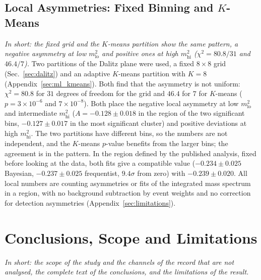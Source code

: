 \subsection{Local Asymmetries: Fixed Binning and $K$-Means}
\label{sec:comparison_local}
\emph{In short: the fixed grid and the $K$-means partition show the same pattern, a negative asymmetry at low $m^2_{\mathrm{lo}}$ and positive ones at high $m^2_{\mathrm{hi}}$ ($\chi^2=80.8/31$ and $46.4/7$).}
Two partitions of the Dalitz plane were used, a fixed $8\times8$ grid (Sec.~\ref{sec:dalitz}) and an adaptive $K$-means partition with $K=8$ (Appendix~\ref{sec:ml_kmeans}). Both find that the asymmetry is not uniform: $\chi^2=80.8$ for $31$ degrees of freedom for the grid and $46.4$ for $7$ for $K$-means ($p=3\times10^{-6}$ and $7\times10^{-8}$). Both place the negative local asymmetry at low $m^2_{\mathrm{lo}}$ and intermediate $m^2_{\mathrm{hi}}$ ($A=-0.128\pm0.018$ in the region of the two significant bins, $-0.127\pm0.017$ in the most significant cluster) and positive deviations at high $m^2_{\mathrm{hi}}$. The two partitions have different bins, so the numbers are not independent, and the $K$-means $p$-value benefits from the larger bins; the agreement is in the pattern. In the region defined by the published analysis, fixed before looking at the data, both fits give a compatible value ($-0.234\pm0.025$ Bayesian, $-0.237\pm0.025$ frequentist, $9.4\sigma$ from zero) with $-0.239\pm0.020$. All local numbers are counting asymmetries or fits of the integrated mass spectrum in a region, with no background subtraction by event weights and no correction for detection asymmetries (Appendix~\ref{sec:limitations}).
\FloatBarrier

\section{Conclusions, Scope and Limitations}
\label{app:conclusions}
\emph{In short: the scope of the study and the channels of the record that are not analysed, the complete text of the conclusions, and the limitations of the result.}

